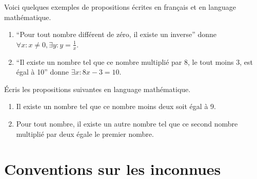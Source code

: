 \begin{comment}
	\begin{table}[H]
	    \centering
	    \begin{tabular}{|c|c|c|}
	        \hline
	        \textbf{Symbole} & \textbf{Nom} & \textbf{Signification} \\ \hline
	        $\exists \_\_\_$ & il existe & Il existe au moins un \_\_\_ \\ \hline
	        $\exists ! \_\_\_$ & il existe un unique & Il existe exactement un seul \_\_\_ \\ \hline
	        $\forall \_\_\_, ...$ & pour tout & Peut importe la valeur prise par \_\_\_, nous avons... \\ \hline
	        $\_\_\_ : \_\_\_$ & tel que & \_\_\_ est définie de manière que \_\_\_ soit vrai \\ \hline
	    \end{tabular}
	\end{table}
\end{comment}

\begin{exemple}
    Voici quelques exemples de propositions écrites en français et en language mathématique.
    \begin{enumerate}
        \item ``Pour tout nombre différent de zéro, il existe un inverse'' donne $\forall x : x\not=0, \exists y : y=\frac1x$.
        \item ``Il existe un nombre tel que ce nombre multiplié par 8, le tout moins 3, est égal à 10'' donne $\exists x : 8x - 3 = 10$.
    \end{enumerate}
\end{exemple}

\vspace{1em}

\begin{exercice}
    Écris les propositions suivantes en language mathématique.
    \begin{enumerate}
        \item Il existe un nombre tel que ce nombre moins deux soit égal à 9.
        \item Pour tout nombre, il existe un autre nombre tel que ce second nombre multiplié par deux égale le premier nombre.
    \end{enumerate}
\end{exercice}

\section{Conventions sur les inconnues}

